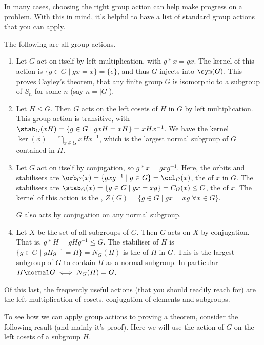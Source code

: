 In many cases, choosing the right group action can help make progress on a problem. With this in mind, it's helpful to have a list of standard group actions that you can apply.

\begin{example}
	The following are all group actions.
	\begin{enumerate}[label=(\roman*)]
		\item Let $G$ act on itself by left multiplication, with $g * x = gx$. The kernel of this action is $\{g \in G \mid gx = x \} = \{e\}$, and thus $G$ injects into $\sym(G)$. This proves Cayley's theorem, that any finite group $G$ is isomorphic to a subgroup of $S_n$ for some $n$ (say $n = |G|$).
		\item Let $H \leq G$. Then $G$ acts on the left cosets of $H$ in $G$ by left multiplication. This group action is transitive, with $\stab_G(xH) = \{ g \in G \mid gxH = xH \} = xHx^{-1}$. We have the kernel $\ker(\phi) = \bigcap_{x \in G} xHx^{-1}$, which is the largest normal subgroup of $G$ contained in $H$.
		\item Let $G$ act on itself by conjugation, so $g * x = gxg^{-1}$. Here, the orbits and stabilisers are $\orb_G(x) = \{ gxg^{-1} \mid g \in G \} = \ccl_G(x)$, the  of $x$ in $G$. The stabilisers are $\stab_G(x) = \{ g \in G \mid gx = xg \} = C_G(x) \leq G$, the  of $x$. The kernel of this action is the , $Z(G) = \{ g \in G \mid gx = xg \; \forall x \in G \}$.
		
		$G$ also acts by conjugation on any normal subgroup.

		\item Let $X$ be the set of all subgroups of $G$. Then $G$ acts on $X$ by conjugation. That is, $g * H = g H g^{-1} \leq G$. The stabiliser of $H$ is $\{g \in G \mid gHg^{-1} = H \} = N_G(H)$ is the  of $H$ in $G$. This is the largest subgroup of $G$ to contain $H$ as a normal subgroup. In particular $H \normal G \iff N_G(H) = G$. 
	\end{enumerate}
\end{example}

Of this last, the frequently useful actions (that you should readily reach for) are the left multiplication of cosets, conjugation of elements and subgroups.


To see how we can apply group actions to proving a theorem, consider the following result (and mainly it's proof). Here we will use the action of $G$ on the left cosets of a subgroup $H$.

